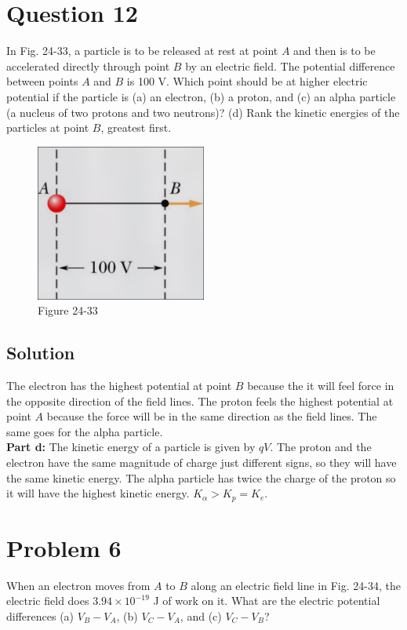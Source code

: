 \documentclass{article}
\begin{document}
\section*{Question 12}
In Fig. 24-33, a particle is to be released at rest at point $A$ and then is to be accelerated directly through point $B$ by an electric field. The potential difference between points $A$ and $B$ is 100 V. Which point should be at higher electric potential if the particle is (a) an electron, (b) a proton, and (c) an alpha particle (a nucleus of two protons and two neutrons)? (d) Rank the kinetic energies of the particles at point $B$, greatest first.

\begin{figure}[h]
	\centering
	\includegraphics[width=0.5\textwidth]{image-4.png}
	\caption{Figure 24-33}
\end{figure}

\subsection*{Solution}
The electron has the highest potential at point $B$ because the it will feel force in the opposite direction of the field lines. The proton feels the highest potential at point $A$ because the force will be in the same direction as the field lines. The same goes for the alpha particle. \\[10pt]
\textbf{Part d:} The kinetic energy of a particle is given by $qV$. The proton and the electron have the same magnitude of charge just different signs, so they will have the same kinetic energy. The alpha particle has twice the charge of the proton so it will have the highest kinetic energy. $K_\alpha > K_p = K_e$.


\section*{Problem 6}
When an electron moves from $A$ to $B$ along an electric field line in Fig. 24-34, the electric field does $3.94 \times 10^{-19}$ J of work on it. What are the electric potential differences (a) $V_B - V_A$, (b) $V_C - V_A$, and (c) $V_C - V_B$?
\end{document}
